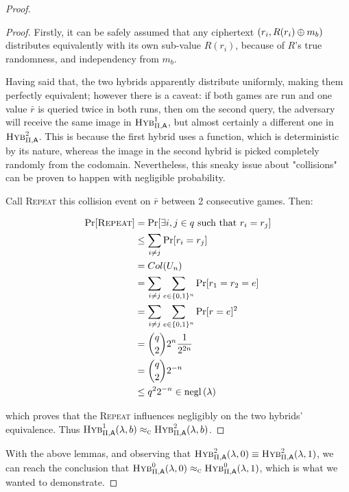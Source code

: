 \begin{proof}
    \begin{proof}
        Firstly, it can be safely assumed that any ciphertext $(r_i, R(r_i) \oplus m_b)$ distributes equivalently with its own sub-value $R(r_i)$, because of $R$'s true randomness, and independency from $m_b$.

        Having said that, the two hybrids apparently distribute uniformly, making them perfectly equivalent; however there is a caveat: if both games are run and one value $\bar{r}$ is queried twice in both runs, then om the second query, the adversary will receive the same image in $\hybridg{1}$, but almost certainly a different one in $\hybridg{2}$. This is because the first hybrid uses a function, which is deterministic by its nature, whereas the image in the second hybrid is picked completely randomly from the codomain. Nevertheless, this sneaky issue about "collisions" can be proven to happen with negligible probability.

        Call \textsc{Repeat} this collision event on $\bar{r}$ between 2 consecutive games. Then:
        
        \begin{align*}
        \Pr[\textsc{Repeat}] &= \Pr[\exists i, j \in q \text{ such that } r_i = r_j] \\
            &\leq \sum_{i \neq j} \Pr[r_i=r_j] \\
            &= Col(U_n) \\
            &= \sum_{i \neq j} \sum_{e \in \{0, 1\}^n} \Pr[r_1 = r_2 = e] \\
            &= \sum_{i \neq j} \sum_{e \in \{0, 1\}^n} \Pr[r = e]^{2} \\
            &= {q \choose 2} 2^{n} \frac{1}{2^{2n}} \\
            &= {q \choose 2} 2^{-n} \\
            &\leq q^{2}2^{-n} \in \mathrm{negl}\left({\lambda}\right) 
        \end{align*} 


        which proves that the \textsc{Repeat} influences negligibly on the two hybrids' equivalence. Thus $\hybridg{1}(\lambda, b) \compindist \hybridg{2}(\lambda, b)$\footnotemark.
        
    \end{proof}

    With the above lemmas, and observing that $\hybridg{2}(\lambda, 0) \equiv \hybridg{2}(\lambda, 1)$, we can reach the conclusion that $\hybridg{0}(\lambda, 0) \compindist \hybridg{0}(\lambda, 1)$, which is what we wanted to demonstrate.

\end{proof}
